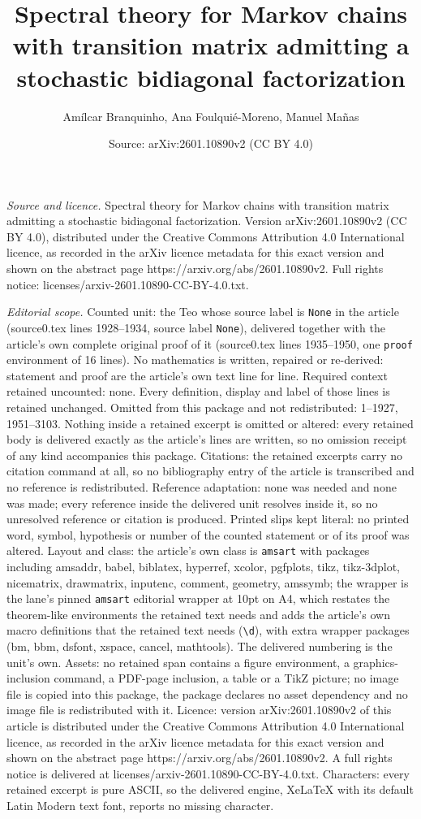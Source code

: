 \documentclass[10pt,a4paper]{amsart}
\title[Spectral theory for Markov chains with transition matrix adm]{Spectral theory for Markov chains with transition matrix admitting a stochastic bidiagonal factorization}
\author{Am\'ilcar Branquinho, Ana Foulqui\'e-Moreno, Manuel Ma\~nas}
\date{Source: arXiv:2601.10890v2 (CC BY 4.0)}
\begin{document}
\maketitle

\noindent\emph{Source and licence.} Spectral theory for Markov chains with transition matrix admitting a stochastic bidiagonal factorization. Version arXiv:2601.10890v2 (CC BY 4.0), distributed under the Creative Commons Attribution 4.0 International licence, as recorded in the arXiv licence metadata for this exact version and shown on the abstract page https://arxiv.org/abs/2601.10890v2. Full rights notice: licenses/arxiv-2601.10890-CC-BY-4.0.txt.\par\smallskip

\noindent\textit{Editorial scope.} Counted unit: the Teo whose source label is \texttt{None} in the article (source0.tex lines 1928--1934, source label \texttt{None}), delivered together with the article's own complete original proof of it (source0.tex lines 1935--1950, one \texttt{proof} environment of 16 lines). No mathematics is written, repaired or re-derived: statement and proof are the article's own text line for line. Required context retained uncounted: none. Every definition, display and label of those lines is retained unchanged. Omitted from this package and not redistributed: 1--1927, 1951--3103. Nothing inside a retained excerpt is omitted or altered: every retained body is delivered exactly as the article's lines are written, so no omission receipt of any kind accompanies this package. Citations: the retained excerpts carry no citation command at all, so no bibliography entry of the article is transcribed and no reference is redistributed. Reference adaptation: none was needed and none was made; every reference inside the delivered unit resolves inside it, so no unresolved reference or citation is produced. Printed slips kept literal: no printed word, symbol, hypothesis or number of the counted statement or of its proof was altered. Layout and class: the article's own class is \texttt{amsart} with packages including amsaddr, babel, biblatex, hyperref, xcolor, pgfplots, tikz, tikz-3dplot, nicematrix, drawmatrix, inputenc, comment, geometry, amssymb; the wrapper is the lane's pinned \texttt{amsart} editorial wrapper at 10pt on A4, which restates the theorem-like environments the retained text needs and adds the article's own macro definitions that the retained text needs (\texttt{\textbackslash d}), with extra wrapper packages (bm, bbm, dsfont, xspace, cancel, mathtools). The delivered numbering is the unit's own. Assets: no retained span contains a figure environment, a graphics-inclusion command, a PDF-page inclusion, a table or a TikZ picture; no image file is copied into this package, the package declares no asset dependency and no image file is redistributed with it. Licence: version arXiv:2601.10890v2 of this article is distributed under the Creative Commons Attribution 4.0 International licence, as recorded in the arXiv licence metadata for this exact version and shown on the abstract page https://arxiv.org/abs/2601.10890v2. A full rights notice is delivered at licenses/arxiv-2601.10890-CC-BY-4.0.txt. Characters: every retained excerpt is pure ASCII, so the delivered engine, XeLaTeX with its default Latin Modern text font, reports no missing character.
\end{document}
